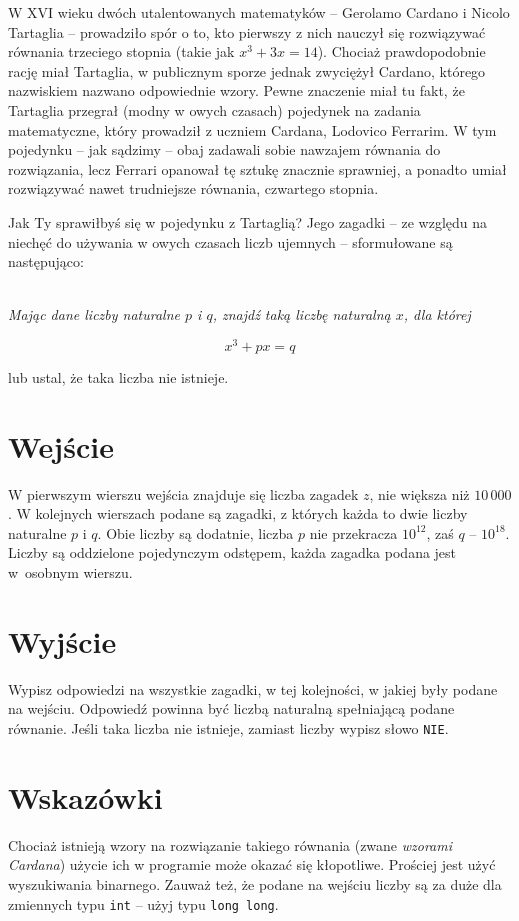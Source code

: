 \documentclass{spiral-kurs}
\begin{document}
\makeheader
%
   W XVI wieku dwóch utalentowanych matematyków -- Gerolamo Cardano i Nicolo Tartaglia -- prowadziło spór o to, kto pierwszy z nich nauczył się rozwiązywać równania trzeciego stopnia (takie jak $x^3 + 3x = 14$).
   Chociaż prawdopodobnie rację miał Tartaglia, w publicznym sporze jednak zwyciężył Cardano, którego nazwiskiem nazwano odpowiednie wzory. Pewne znaczenie miał tu fakt, że Tartaglia przegrał (modny w owych czasach) 
pojedynek na zadania matematyczne, który prowadził z uczniem Cardana, Lodovico Ferrarim.
   W tym pojedynku -- jak sądzimy -- obaj zadawali sobie nawzajem równania do rozwiązania, lecz Ferrari opanował tę sztukę znacznie sprawniej, a ponadto umiał rozwiązywać nawet trudniejsze równania, czwartego stopnia.

   Jak Ty sprawiłbyś się w pojedynku z Tartaglią? Jego zagadki -- ze względu na niechęć do używania w owych czasach liczb ujemnych -- sformułowane są następująco: \\\

   { \it
   Mając dane liczby naturalne $p$ i $q$, znajdź taką liczbę naturalną $x$, dla której

	$$x^3 + px = q$$

   lub ustal, że taka liczba nie istnieje.
   }

   \section{Wejście}
   W pierwszym wierszu wejścia znajduje się liczba zagadek $z$, nie większa niż $10\,000$. W kolejnych wierszach podane są zagadki, z których każda to dwie liczby naturalne $p$ i $q$. Obie liczby są dodatnie, liczba $p$ nie przekracza $10^{12}$, zaś $q$ -- $10^{18}$.
Liczby są oddzielone pojedynczym odstępem, każda zagadka podana jest w~osobnym wierszu.
  \section{Wyjście}
  Wypisz odpowiedzi na wszystkie zagadki, w tej kolejności, w jakiej były podane na wejściu. Odpowiedź powinna być liczbą naturalną spełniającą podane równanie. Jeśli taka liczba nie istnieje, zamiast liczby wypisz słowo {\tt NIE}.

  \section{Wskazówki}
  Chociaż istnieją wzory na rozwiązanie takiego równania (zwane {\it wzorami Cardana}) użycie ich w programie może okazać się kłopotliwe. Prościej jest użyć wyszukiwania binarnego. 
Zauważ też, że podane na wejściu liczby są za duże dla zmiennych typu {\tt int} -- użyj typu {\tt long long}.


  
\end{document}
